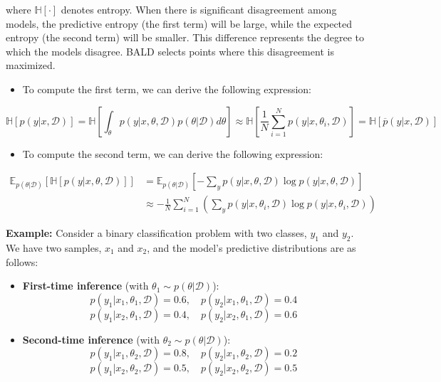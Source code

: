 \documentclass[
  letterpaper,
  numbers=noenddot,
  DIV=11,
  oneside]{scrreprt}
\providecommand{\tightlist}{%
  \setlength{\itemsep}{0pt}\setlength{\parskip}{0pt}}\usepackage{longtable,booktabs,array}
\theoremstyle{remark}
\begin{document}
where \(\mathbb{H}[\cdot]\) denotes entropy. When there is significant
disagreement among models, the predictive entropy (the first term) will
be large, while the expected entropy (the second term) will be smaller.
This difference represents the degree to which the models disagree. BALD
selects points where this disagreement is maximized.

\begin{itemize}
\tightlist
\item
  To compute the first term, we can derive the following expression:
\end{itemize}

\[
\mathbb{H}[p(y|x, \mathcal{D})] = \mathbb{H}\left[\int_{\theta} p(y|x, \theta, \mathcal{D}) p(\theta | \mathcal{D}) d\theta\right] \approx \mathbb{H}\left[\frac{1}{N}\sum_{i=1}^{N} p(y|x, \theta_i, \mathcal{D})\right] = \mathbb{H}\left[\overline{p}(y|x, \mathcal{D})\right]
\]

\begin{itemize}
\tightlist
\item
  To compute the second term, we can derive the following expression:
\end{itemize}

\[\begin{aligned}
\mathbb{E}_{p(\theta|\mathcal{D})} [\mathbb{H}[p(y|x, \theta, \mathcal{D})]] &= \mathbb{E}_{p(\theta|\mathcal{D})} \left[ - \sum_{y} p(y|x, \theta, \mathcal{D}) \log p(y|x, \theta, \mathcal{D}) \right] \\
&\approx - \frac{1}{N} \sum_{i=1}^{N} \left( \sum_{y} p(y|x, \theta_i, \mathcal{D}) \log p(y|x, \theta_i, \mathcal{D}) \right)
\end{aligned}\]

\textbf{Example:} Consider a binary classification problem with two
classes, \(y_1\) and \(y_2\). We have two samples, \(x_1\) and \(x_2\),
and the model's predictive distributions are as follows:

\begin{itemize}
\item
  \textbf{First-time inference} (with
  \(\theta_1 \sim p(\theta | \mathcal{D})\)): \[
  p(y_1|x_1, \theta_1, \mathcal{D}) = 0.6, \quad p(y_2|x_1, \theta_1, \mathcal{D}) = 0.4
  \] \[
  p(y_1|x_2, \theta_1, \mathcal{D}) = 0.4, \quad p(y_2|x_2, \theta_1, \mathcal{D}) = 0.6
  \]
\item
  \textbf{Second-time inference} (with
  \(\theta_2 \sim p(\theta | \mathcal{D})\)): \[
  p(y_1|x_1, \theta_2, \mathcal{D}) = 0.8, \quad p(y_2|x_1, \theta_2, \mathcal{D}) = 0.2
  \] \[
  p(y_1|x_2, \theta_2, \mathcal{D}) = 0.5, \quad p(y_2|x_2, \theta_2, \mathcal{D}) = 0.5
  \]
\end{itemize}
\end{document}
